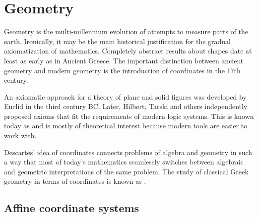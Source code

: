 \section{Geometry}\label{sec:geometry}

\begin{remark}\label{def:coordinates_in_geometry}
  Geometry is the multi-millennium evolution of attempts to measure parts of the earth. Ironically, it may be the main historical justification for the gradual axiomatization of mathematics. Completely abstract results about shapes date at least as early as in Ancient Greece. The important distinction between ancient geometry and modern geometry is the introduction of coordinates in the 17th century.

  An axiomatic approach for a theory of plane and solid figures was developed by Euclid in the third century BC. Later, Hilbert, Tarski and others independently proposed axioms that fit the requirements of modern logic systems. This is known today as  and is mostly of theoretical interest because modern tools are easier to work with.

  Descartes' idea of coordinates connects problems of algebra and geometry in such a way that most of today's mathematics seamlessly switches between algebraic and geometric interpretations of the same problem. The study of classical Greek geometry in terms of coordinates is known as .
\end{remark}

\subsection{Affine coordinate systems}\label{subsec:affine_coordinate_system}

